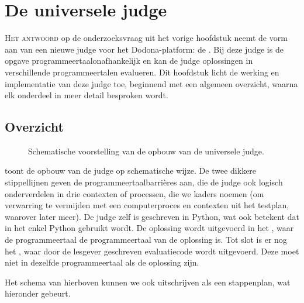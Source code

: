\chapter{De universele judge}\label{ch:de-universele-judge}

\lettrine{H}{et antwoord} op de onderzoeksvraag uit het vorige hoofdstuk neemt de vorm aan van een nieuwe judge voor het Dodona-platform: de .
Bij deze judge is de opgave programmeertaalonafhankelijk en kan de judge oplossingen in verschillende programmeertalen evalueren.
Dit hoofdstuk licht de werking en implementatie van deze judge toe, beginnend met een algemeen overzicht, waarna elk onderdeel in meer detail besproken wordt.

\section{Overzicht}\label{sec:overzicht}

\begin{figure}
    \begin{adjustbox}{width=\textwidth}
        
    \end{adjustbox}
    \caption{Schematische voorstelling van de opbouw van de universele judge.}
    \label{fig:universal-judge}
\end{figure}

 toont de opbouw van de judge op schematische wijze.
De twee dikkere stippellijnen geven de programmeertaalbarrières aan, die de judge ook logisch onderverdelen in drie contexten of processen, die we kaders noemen (om verwarring te vermijden met een computerproces en contexten uit het testplan, waarover later meer).
De judge zelf is geschreven in Python, wat ook betekent dat in het  enkel Python gebruikt wordt.
De oplossing wordt uitgevoerd in het , waar de programmeertaal de programmeertaal van de oplossing is.
Tot slot is er nog het , waar door de lesgever geschreven evaluatiecode wordt uitgevoerd.
Deze moet niet in dezelfde programmeertaal als de oplossing zijn.


Het schema van hierboven kunnen we ook uitschrijven als een stappenplan, wat hieronder gebeurt.

